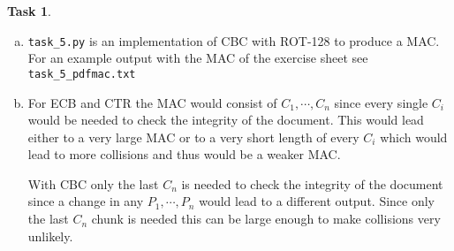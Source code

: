 \documentclass[ngerman, fleqn, DIV=15, headinclude]{scrartcl}
\theoremstyle{definition}
\newtheorem{exercise}{Task}
\begin{document}
\begin{exercise}\hfill

    \begin{enumerate}[a)]
        \item \verb$task_5.py$ is an implementation of CBC with ROT-128 to
            produce a MAC. For an example output with the MAC of the exercise
            sheet see \verb$task_5_pdfmac.txt$
        \item For ECB and CTR the MAC would consist of $C_1, \cdots , C_n$
            since every single $C_i$ would be needed to check the integrity of
            the document. This would lead either to a very large MAC or to a
            very short length of every $C_i$ which would lead to more
            collisions and thus would be a weaker MAC.

            With CBC only the last $C_n$ is needed to check the integrity of
            the document since a change in any $P_1, \cdots, P_n$ would lead to
            a different output. Since only the last $C_n$ chunk is needed this
            can be large enough to make collisions very unlikely.
    \end{enumerate}
\end{exercise}
\end{document}
